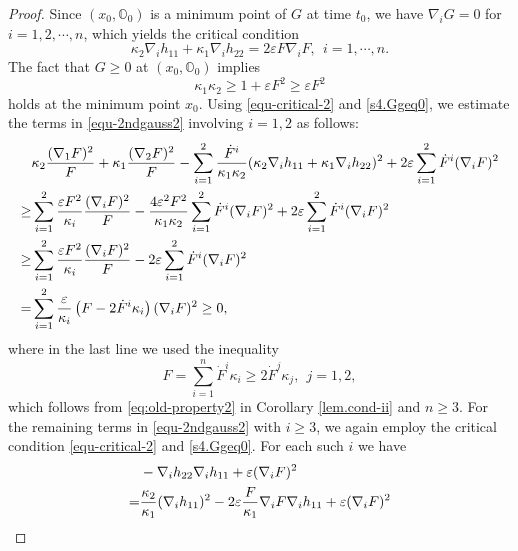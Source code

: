 \documentclass[11pt,reqno]{amsart}
\theoremstyle{remark}
\numberwithin{equation}{section}
\begin{document}
\begin{proof}
    Since $(x_0,\mathbb{O}_0)$ is a minimum point of $G$ at time $t_0$, we have $\nabla_i G=0$ for $i=1,2,\cdots,n$, which yields the critical condition
    \begin{equation}
    	\kappa_2 \nabla_i h_{11} + \kappa_1 \nabla_i h_{22} =2\varepsilon F\nabla_i F,\ \ i=1,\cdots,n.
    	\label{equ-critical-2}
    \end{equation} 
	The fact that $G\geq 0$ at $(x_0,\mathbb{O}_0)$ implies 
    \begin{equation}\label{s4.Ggeq0}
        \kappa_1\kappa_2 \geq 1+\varepsilon F^2\geq \varepsilon F^2
    \end{equation}
holds at the minimum point $x_0$.    Using \eqref{equ-critical-2} and \eqref{s4.Ggeq0},  we estimate the terms in \eqref{equ-2ndgauss2} involving $i=1,2$ as follows:
    \begin{align}
    	&\kappa_2 \dfrac{(\nabla_1 F)^2}{F} + \kappa_1 \dfrac{(\nabla_2 F)^2}{F} - \sum\limits_{i=1}^2 \dfrac{\dot{F}^i}{\kappa_1 \kappa_2}(\kappa_2 \nabla_i h_{11}+ \kappa_1 \nabla_i h_{22})^2 + 2\varepsilon \sum\limits_{i=1}^2 \dot{F}^i (\nabla_i F)^2 \nonumber\\
    	\geq & \sum\limits_{i=1}^2 \dfrac{\varepsilon F^2}{\kappa_i}\dfrac{(\nabla_i F)^2}{F} - \dfrac{4\varepsilon^2 F^2}{\kappa_1 \kappa_2} \sum\limits_{i=1}^2 \dot{F}^i (\nabla_i F)^2 +  2\varepsilon \sum\limits_{i=1}^2 \dot{F}^i (\nabla_i F)^2 \nonumber\\
    	\geq & \sum\limits_{i=1}^2 \dfrac{\varepsilon F^2}{\kappa_i}\dfrac{(\nabla_i F)^2}{F} - 2\varepsilon \sum\limits_{i=1}^2 \dot{F}^i (\nabla_i F)^2 \notag\\
    	= & \sum\limits_{i=1}^2 \frac{\varepsilon}{\kappa_i}\left(F-2\dot{F}^{i}\kappa_i\right)(\nabla_i F)^2 \geq 0,
    	\label{equ-est1}
    \end{align}
    where in the last line we used the inequality
    \begin{equation*}
    	F = \sum\limits_{i=1}^n \dot{F}^i \kappa_i \geq 2 \dot{F}^j\kappa_j,\ \ j=1,2,
    \end{equation*}
	which follows from \eqref{eq:old-property2} in Corollary \ref{lem.cond-ii} and $n\geq 3$. For the remaining terms in \eqref{equ-2ndgauss2} with $i\geq 3$, we again employ the critical condition \eqref{equ-critical-2} and \eqref{s4.Ggeq0}.  For each such $i$ we have
    \begin{align*}
    	& -\nabla_i h_{22}\nabla_i h_{11} + \varepsilon (\nabla_i F)^2 \nonumber\\
    	=& \dfrac{\kappa_2}{\kappa_1}(\nabla_i h_{11})^2 - 2\varepsilon\dfrac{F}{\kappa_1}\nabla_i F \nabla_i h_{11} + \varepsilon(\nabla_i F)^2 \notag\\

\end{align*}
\end{proof}
\end{document}

